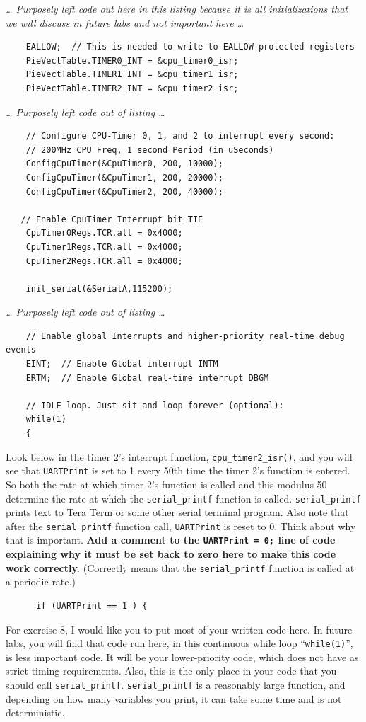 \documentclass[11pt]{article}
\begin{document}
%
\textit{… Purposely left code out here in this listing because it is all initializations that we will discuss in future labs and not important here …}
%
\begin{verbatim}
    EALLOW;  // This is needed to write to EALLOW-protected registers
    PieVectTable.TIMER0_INT = &cpu_timer0_isr;
    PieVectTable.TIMER1_INT = &cpu_timer1_isr;
    PieVectTable.TIMER2_INT = &cpu_timer2_isr;
\end{verbatim}
%
\textit{… Purposely left code out of listing …}
%
\begin{verbatim}
    // Configure CPU-Timer 0, 1, and 2 to interrupt every second:
    // 200MHz CPU Freq, 1 second Period (in uSeconds)
    ConfigCpuTimer(&CpuTimer0, 200, 10000);
    ConfigCpuTimer(&CpuTimer1, 200, 20000);
    ConfigCpuTimer(&CpuTimer2, 200, 40000);

   // Enable CpuTimer Interrupt bit TIE
    CpuTimer0Regs.TCR.all = 0x4000;
    CpuTimer1Regs.TCR.all = 0x4000;
    CpuTimer2Regs.TCR.all = 0x4000;

    init_serial(&SerialA,115200);
\end{verbatim}
%
\textit{… Purposely left code out of listing …}
%
\begin{verbatim}
    // Enable global Interrupts and higher-priority real-time debug events
    EINT;  // Enable Global interrupt INTM
    ERTM;  // Enable Global real-time interrupt DBGM

    // IDLE loop. Just sit and loop forever (optional):
    while(1)
    {
\end{verbatim}
%
Look below in the timer 2’s interrupt function, \texttt{cpu\_timer2\_isr()}, and you will see that \texttt{UARTPrint} is set to 1 every 50th time the timer 2’s function is entered. So both the rate at which timer 2’s function is called and this modulus 50 determine the rate at which the \texttt{serial\_printf} function is called. \texttt{serial\_printf} prints text to Tera Term or some other serial terminal program. Also note that after the \texttt{serial\_printf} function call, \texttt{UARTPrint} is reset to 0. Think about why that is important. \textbf{Add a comment to the \texttt{UARTPrint = 0;} line of code explaining why it must be set back to zero here to make this code work correctly.}  (Correctly means that the \texttt{serial\_printf} function is called at a periodic rate.)
%
\begin{verbatim}
      if (UARTPrint == 1 ) {
\end{verbatim}
%
For exercise 8, I would like you to put most of your written code here. In future labs, you will find that code run here, in this continuous while loop “\texttt{while(1)}”, is less important code. It will be your lower-priority code, which does not have as strict timing requirements. Also, this is the only place in your code that you should call \texttt{serial\_printf}. \texttt{serial\_printf} is a reasonably large function, and depending on how many variables you print, it can take some time and is not deterministic.
\end{document}
